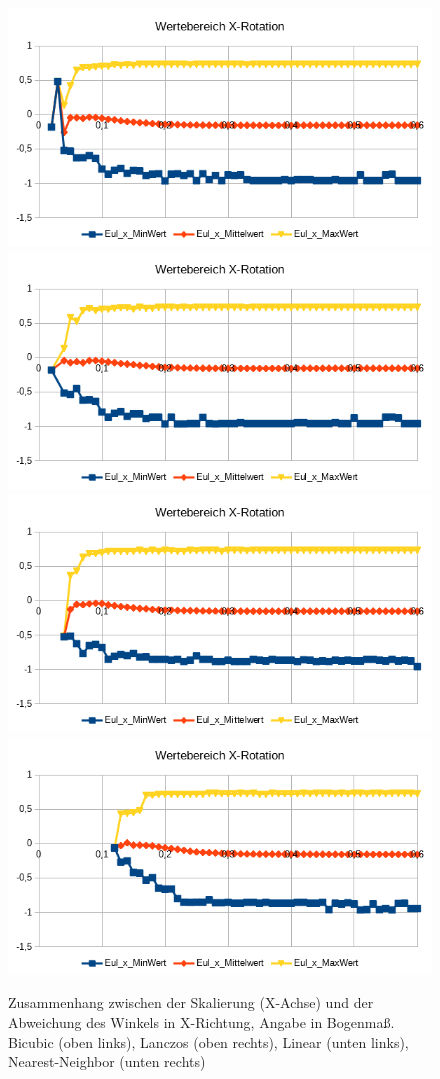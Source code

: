\begin{figure}
	\centering
	\includegraphics[width=0.45\linewidth]{tabelle2/X_Rot_Val_Cubic}
	\includegraphics[width=0.45\linewidth]{tabelle2/X_Rot_Val_Lanc}
	\includegraphics[width=0.45\linewidth]{tabelle2/X_Rot_Val_Linear}
	\includegraphics[width=0.45\linewidth]{tabelle2/X_Rot_Val_NN}
	\caption{Zusammenhang zwischen der Skalierung (X-Achse) und der Abweichung des Winkels in X-Richtung, Angabe in Bogenmaß. 
		Bicubic (oben links), Lanczos (oben rechts), Linear (unten links), Nearest-Neighbor (unten rechts)}
	\label{img_X_Rot_Val_Skal}
\end{figure}
